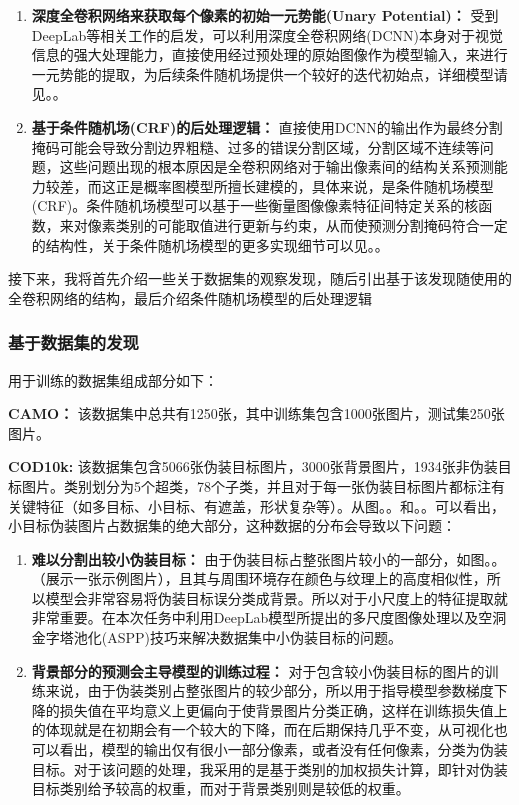 \documentclass[a4paper,12pt]{ctexart}
\begin{document}
\begin{enumerate}
    \item \textbf{深度全卷积网络来获取每个像素的初始一元势能(Unary Potential)：} 受到DeepLab\cite{Chen2016DeepLabSI}等相关工作的启发，可以利用深度全卷积网络(DCNN)本身对于视觉信息的强大处理能力，直接使用经过预处理的原始图像作为模型输入，来进行一元势能的提取，为后续条件随机场提供一个较好的迭代初始点，详细模型请见。。
    \item \textbf{基于条件随机场(CRF)的后处理逻辑：} 直接使用DCNN的输出作为最终分割掩码可能会导致分割边界粗糙、过多的错误分割区域，分割区域不连续等问题，这些问题出现的根本原因是全卷积网络对于输出像素间的结构关系预测能力较差，而这正是概率图模型所擅长建模的，具体来说，是条件随机场模型(CRF)。条件随机场模型可以基于一些衡量图像像素特征间特定关系的核函数，来对像素类别的可能取值进行更新与约束，从而使预测分割掩码符合一定的结构性，关于条件随机场模型的更多实现细节可以见。。
\end{enumerate}

接下来，我将首先介绍一些关于数据集的观察发现，随后引出基于该发现随使用的全卷积网络的结构，最后介绍条件随机场模型的后处理逻辑

\subsubsection{基于数据集的发现}
用于训练的数据集组成部分如下：

\textbf{CAMO\cite{Le2019AnabranchNF}：} 该数据集中总共有1250张，其中训练集包含1000张图片，测试集250张图片。

\textbf{COD10k\cite{Fan2020CamouflagedOD}: } 该数据集包含5066张伪装目标图片，3000张背景图片，1934张非伪装目标图片。类别划分为5个超类，78个子类，并且对于每一张伪装目标图片都标注有关键特征（如多目标、小目标、有遮盖，形状复杂等）。从图。。和。。可以看出，小目标伪装图片占数据集的绝大部分，这种数据的分布会导致以下问题：
\begin{enumerate}
    \item \textbf{难以分割出较小伪装目标：} 由于伪装目标占整张图片较小的一部分，如图。。（展示一张示例图片），且其与周围环境存在颜色与纹理上的高度相似性，所以模型会非常容易将伪装目标误分类成背景。所以对于小尺度上的特征提取就非常重要。在本次任务中利用DeepLab模型所提出的多尺度图像处理以及空洞金字塔池化(ASPP)技巧来解决数据集中小伪装目标的问题。
	\item \textbf{背景部分的预测会主导模型的训练过程：} 对于包含较小伪装目标的图片的训练来说，由于伪装类别占整张图片的较少部分，所以用于指导模型参数梯度下降的损失值在平均意义上更偏向于使背景图片分类正确，这样在训练损失值上的体现就是在初期会有一个较大的下降，而在后期保持几乎不变，从可视化也可以看出，模型的输出仅有很小一部分像素，或者没有任何像素，分类为伪装目标。对于该问题的处理，我采用的是基于类别的加权损失计算，即针对伪装目标类别给予较高的权重，而对于背景类别则是较低的权重。
\end{enumerate}
\end{document}
